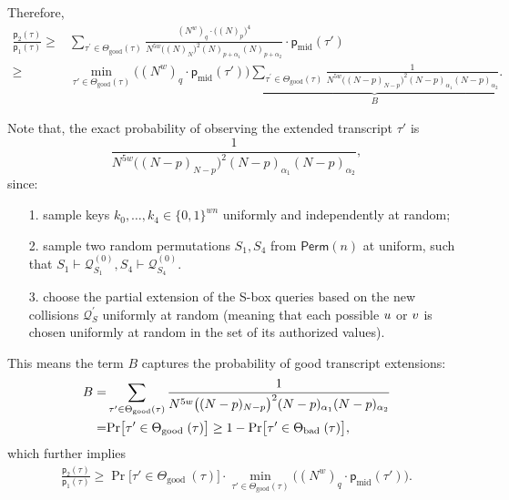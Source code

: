 %
%
Therefore,
%
%
\begin{align*}
\frac{\mathsf{p}_{2}(\tau)}{\mathsf{p}_{1}(\tau)}   \geq  &
\sum_{\tau^{\prime} \in \Theta_{\mathrm{good}}(\tau)}
\frac{(N^w)_q\cdot\big((N)_p\big)^4}{N^{5w}\big((N)_{N}\big)^2(N)_{p+\alpha_1}(N)_{p+\alpha_2}}\cdot \mathsf{p}_{\mathrm{mid}}(\tau')         \\
\geq  &    \min_{\tau' \in \Theta_{\mathrm{good}}(\tau)}\big((N^w)_q\cdot\mathsf{p}_{\mathrm{mid}}(\tau')\big)
\underbrace{\sum_{\tau^{\prime} \in \Theta_{\mathrm{good}}(\tau)}
\frac{1}{N^{5w}\big((N-p)_{N-p}\big)^2(N-p)_{\alpha_1}(N-p)_{\alpha_2}}}_{B} .
\end{align*}



Note that, the exact probability of observing the extended transcript $\tau'$ is
%
%
$$\frac{1}{N^{5w}\big((N-p)_{N-p}\big)^2(N-p)_{\alpha_1}(N-p)_{\alpha_2}},$$
%
since:
%
\begin{itemize}
	\item[1.] sample keys $k_0,\ldots,k_4\in\{0,1\}^{wn}$ uniformly and independently at random;
	\item[2.] sample two random permutations $S_1,S_4$ from $\mathsf{Perm}(n)$ at uniform, such that $S_1\vdash\mathcal{Q}_{S_1}^{(0)},S_4\vdash\mathcal{Q}_{S_4}^{(0)}$.
	\item[3.] choose the partial extension of the S-box queries based on the new collisions $\mathcal{Q}_{S}^{\prime}$ uniformly at random (meaning that each possible $\mathnormal{u}$ or $\mathnormal{v}$ is chosen uniformly at random in the set of its authorized values).
\end{itemize}
%
%
This means the term $B$ captures the probability of good transcript extensions:
%
%
\begin{align}
B=&\sum_{\tau^{\prime} \in \Theta_{\mathrm{good}}(\tau)}
	\frac{1}{N^{5w}\big((N-p)_{N-p}\big)^2(N-p)_{\alpha_1}(N-p)_{\alpha_2}}  \notag   \\
	=&{\Pr}\big[ \tau' \in \Theta_{\text {good }}(\tau)\big] \geq  1- {\Pr}\big[ \tau' \in \Theta_{\text {bad }}(\tau)\big],   \notag
\end{align}
%
%
which further implies
%
%
\begin{align}
\frac{\mathsf{p}_{2}(\tau)}{\mathsf{p}_{1}(\tau)}   \geq  {\Pr}\big[ \tau' \in \Theta_{\text {good }}(\tau)\big]\cdot
  \min_{\tau' \in \Theta_{\mathrm{good}}(\tau)}\big((N^w)_q\cdot\mathsf{p}_{\mathrm{mid}}(\tau')\big). 
\label{eq:ratio-divide-4-rounds}
\end{align}
%
%


